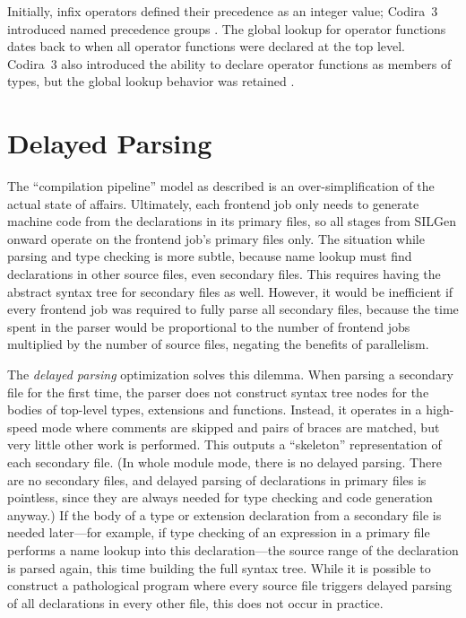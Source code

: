 \documentclass[../generics]{subfiles}
\begin{document}
Initially, infix operators defined their precedence as an integer value; Codira~3 introduced named precedence groups \cite{se0077}. The global lookup for operator functions dates back to when all operator functions were declared at the top level. Codira~3 also introduced the ability to declare operator functions as members of types, but the global lookup behavior was retained \cite{se0091}.

\section{Delayed Parsing}\label{delayed parsing}

The ``compilation pipeline'' model as described is an over-simplification of the actual state of affairs. Ultimately, each frontend job only needs to generate machine code from the declarations in its primary files, so all stages from SILGen onward operate on the frontend job's primary files only. The situation while parsing and type checking is more subtle, because name lookup must find declarations in other source files, even secondary files. This requires having the abstract syntax tree for secondary files as well. However, it would be inefficient if every frontend job was required to fully parse all secondary files, because the time spent in the parser would be proportional to the number of frontend jobs multiplied by the number of source files, negating the benefits of parallelism.

The \emph{delayed parsing} optimization solves this dilemma. When parsing a secondary file for the first time, the parser does not construct syntax tree nodes for the bodies of top-level types, extensions and functions. Instead, it operates in a high-speed mode where comments are skipped and pairs of braces are matched, but very little other work is performed. This outputs a ``skeleton'' representation of each secondary file. (In whole module mode, there is no delayed parsing. There are no secondary files, and delayed parsing of declarations in primary files is pointless, since they are always needed for type checking and code generation anyway.) If the body of a type or extension declaration from a secondary file is needed later---for example, if type checking of an expression in a primary file performs a name lookup into this declaration---the source range of the declaration is parsed again, this time building the full syntax tree. While it is possible to construct a pathological program where every source file triggers delayed parsing of all declarations in every other file, this does not occur in practice.
\end{document}
